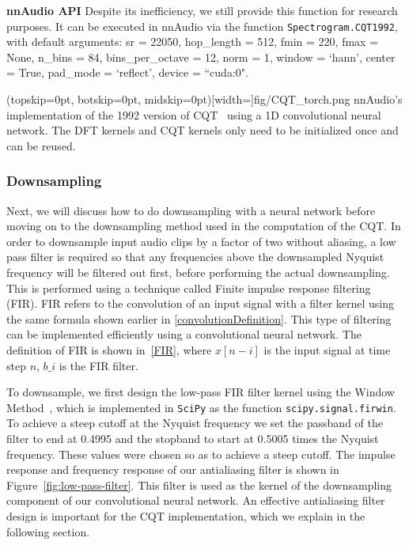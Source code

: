 \documentclass{ieeeaccess}
\newcommand{\nbh}[1]{\texttt{#1}}
\begin{document}
\hspace{11pt} 

\noindent \textbf{nnAudio API} Despite its inefficiency, we still provide this function for research purposes. It can be executed in nnAudio via the function \nbh{Spectrogram.CQT1992}, with default arguments: sr = 22050, hop\_length = 512, fmin = 220, fmax = None, n\_bins = 84, bins\_per\_octave = 12, norm = 1, window = `hann', center = True, pad\_mode = `reflect', device = ``cuda:0".

\Figure[h](topskip=0pt, botskip=0pt, midskip=0pt)[width=\linewidth]{fig/CQT_torch.png}
{nnAudio's implementation of the 1992 version of CQT~\cite{brown1992efficient} using a 1D convolutional neural network. The DFT kernels and CQT kernels only need to be initialized once and can be reused. \label{fig: CQT_torch}}


\subsubsection{Downsampling}
Next, we will discuss how to do downsampling with a neural network before moving on to the downsampling method used in the computation of the CQT. In order to downsample input audio clips by a factor of two without aliasing, a low pass filter is required so that any frequencies above the downsampled Nyquist frequency will be filtered out first, before performing the actual downsampling. This is performed using a technique called Finite impulse response filtering (FIR). FIR refers to the convolution of an input signal with a filter kernel using the same formula shown earlier in \eqref{convolutionDefinition}. This type of filtering can be implemented efficiently using a convolutional neural network.
The definition of FIR is shown in~\eqref{FIR}, where $x[n-i]$ is the input signal at time step $n$, $b\_i$ is the FIR filter. 

To downsample, we first design the low-pass FIR filter kernel using the Window Method~\cite{rajput2012implementation}, which is implemented in \nbh{SciPy} as the function \nbh{scipy.signal.firwin}. To achieve a steep cutoff at the Nyquist frequency we set the passband of the filter to end at 0.4995 and the stopband to start at 0.5005 times the Nyquist frequency. These values were chosen so as to achieve a steep cutoff. The impulse response and frequency response of our antialiasing filter is shown in Figure~\ref{fig:low-pass-filter}. This filter is used as the kernel of the downsampling component of our convolutional neural network. An effective antialiasing filter design is important for the CQT implementation, which we explain in the following section.
\end{document}
